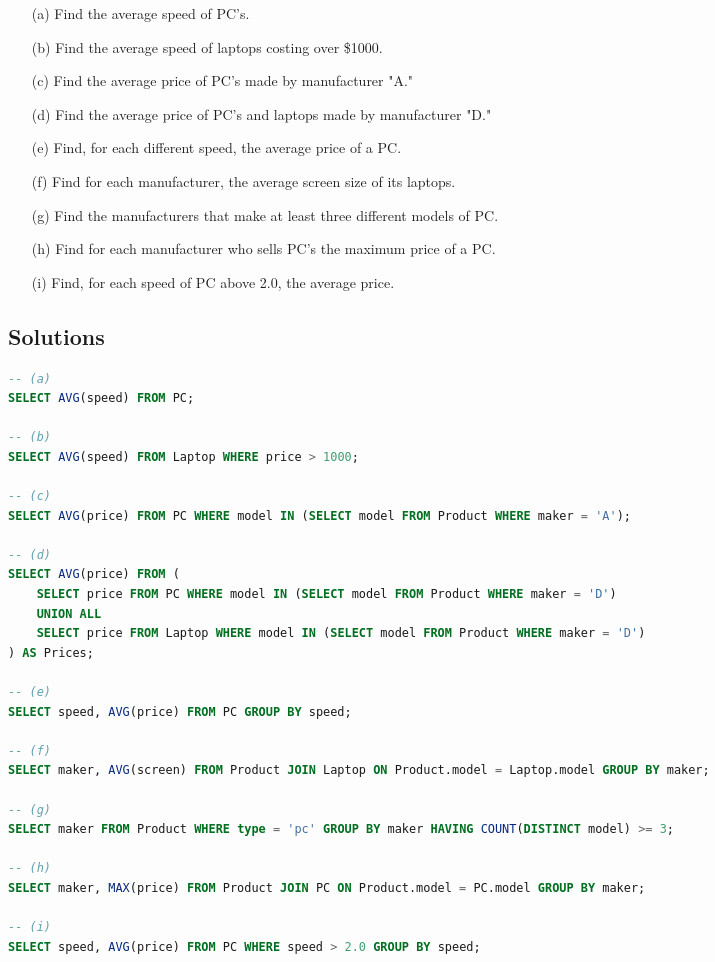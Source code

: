 \documentclass{cshwk}
\begin{document}
\begin{enumerate}
    \item[(a)] Find the average speed of PC's.
    \item[(b)] Find the average speed of laptops costing over \$1000.
    \item[(c)] Find the average price of PC's made by manufacturer "A."
    \item[(d)] Find the average price of PC's and laptops made by manufacturer "D."
    \item[(e)] Find, for each different speed, the average price of a PC.
    \item[(f)] Find for each manufacturer, the average screen size of its laptops.
    \item[(g)] Find the manufacturers that make at least three different models of PC.
    \item[(h)] Find for each manufacturer who sells PC's the maximum price of a PC.
    \item[(i)] Find, for each speed of PC above 2.0, the average price.
\end{enumerate}

\subsection{Solutions}

\begin{lstlisting}[language=sql]
-- (a)
SELECT AVG(speed) FROM PC;

-- (b)
SELECT AVG(speed) FROM Laptop WHERE price > 1000;

-- (c)
SELECT AVG(price) FROM PC WHERE model IN (SELECT model FROM Product WHERE maker = 'A');

-- (d)
SELECT AVG(price) FROM (
    SELECT price FROM PC WHERE model IN (SELECT model FROM Product WHERE maker = 'D')
    UNION ALL
    SELECT price FROM Laptop WHERE model IN (SELECT model FROM Product WHERE maker = 'D')
) AS Prices;

-- (e)
SELECT speed, AVG(price) FROM PC GROUP BY speed;

-- (f)
SELECT maker, AVG(screen) FROM Product JOIN Laptop ON Product.model = Laptop.model GROUP BY maker;

-- (g)
SELECT maker FROM Product WHERE type = 'pc' GROUP BY maker HAVING COUNT(DISTINCT model) >= 3;

-- (h)
SELECT maker, MAX(price) FROM Product JOIN PC ON Product.model = PC.model GROUP BY maker;

-- (i)
SELECT speed, AVG(price) FROM PC WHERE speed > 2.0 GROUP BY speed;
\end{lstlisting}
\end{document}
